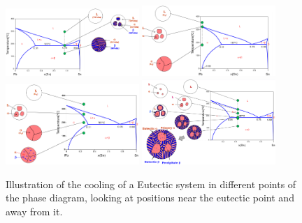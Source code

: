 \begin{figure}[t]
    \centering
    \includegraphics[width=0.45\textwidth]{Immagini/Pb-SnEvo1.png}
    \includegraphics[width=0.45\textwidth]{Immagini/Pb-SnEvo2.png}
    \includegraphics[width=0.45\textwidth]{Immagini/Pb-SnEvo3.png}
    \includegraphics[width=0.45\textwidth]{Immagini/Pb-SnEvo4.png}
    \caption
    {
        Illustration of the cooling of a Eutectic system in different points of the phase diagram, looking at positions near the eutectic point and away from it.
    }
    \label{fig:Pb-SnEvo}
\end{figure}

